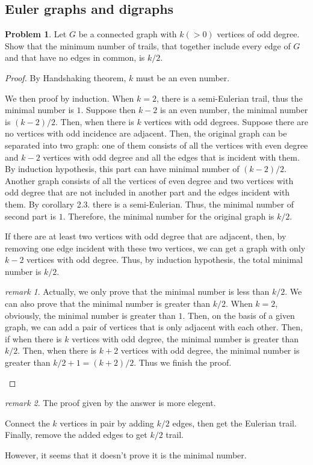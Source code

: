 \documentclass[a4paper,11pt]{article}%
\theoremstyle{remark}
\newtheorem*{remark}{remark}
\theoremstyle{definition}
\newtheorem{problem}{Problem}[subsection]
\begin{document}
\subsection{Euler graphs and digraphs}
\begin{problem}
    Let $G$ be a connected graph with $k(>0)$ vertices of odd degree.
    Show that the minimum number of trails, that together include every edge 
    of $G$ and that have no edges in common, is $k/2$.
    \begin{proof}
        By Handshaking theorem, $k$ must be an even number.    

    We then proof by induction.
    When $k=2$, there is a semi-Eulerian trail, thus the minimal number is $1$.
    Suppose then $k-2$ is an even number, the minimal number is $(k-2)/2$.
    Then, when there is $k$ vertices with odd degrees.
    Suppose there are no vertices with odd incidence are adjacent. Then, 
    the original graph can be separated into two graph:
    one of them consists of all the vertices with even degree and 
    $k-2$ vertices with odd degree and all the edges that is incident with them.
    By induction hypothesis, this part can have minimal number of $(k-2)/2$.
    Another graph consists of all the vertices of even degree and two 
    vertices with odd degree that are not included in another part and the 
    edges incident with them. By corollary 2.3. there is a semi-Eulerian.
    Thus, the minimal number of second part is $1$. Therefore, the minimal 
    number for the original graph is $k/2$.

    If there are at least two vertices with odd degree that are adjacent,
    then, by removing one edge incident with these two vertices, we can 
    get a graph with only $k-2$ vertices with odd degree. Thus, by induction 
    hypothesis, the total minimal number is $k/2$.

    \begin{remark}
        Actually, we only prove that the minimal number is less than $k/2$.
        We can also prove that the minimal number is greater than $k/2$.
        When $k=2$, obviously, the minimal number is greater than $1$.
        Then, on the basis of a given graph, we can add a pair of vertices that 
        is only adjacent with each other. Then, if when there is $k$ vertices 
        with odd degree, the minimal number is greater than $k/2$. Then, when there is 
        $k+2$ vertices with odd degree, the minimal number is greater than $k/2+1=(k+2)/2$.
        Thus we finish the proof.
    \end{remark}
    \end{proof}
    \begin{remark}
        The proof given by the answer is more elegent.

        Connect the $k$ vertices in pair by adding $k/2$ edges,
        then get the Eulerian trail. Finally, remove the added edges to 
        get $k/2$ trail.

        However, it seems that it doesn't prove it is the minimal number.
    \end{remark}
\end{problem}
\end{document}
